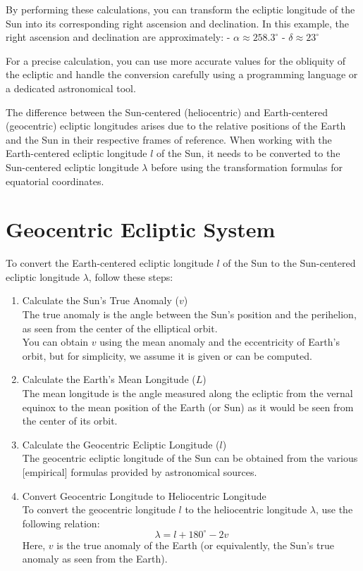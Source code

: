 \documentclass[12pt,a4paper]{article}
\begin{document}
	By performing these calculations, you can transform the ecliptic longitude of the Sun into its corresponding right ascension and declination. In this example, the right ascension and declination are approximately:
	- \(\alpha \approx 258.3^\circ\)
	- \(\delta \approx 23^\circ\)
	
	For a precise calculation, you can use more accurate values for the obliquity of the ecliptic and handle the conversion carefully using a programming language or a dedicated astronomical tool.
	
	The difference between the Sun-centered (heliocentric) and Earth-centered (geocentric) ecliptic longitudes arises due to the relative positions of the Earth and the Sun in their respective frames of reference. When working with the Earth-centered ecliptic longitude \(l\) of the Sun, it needs to be converted to the Sun-centered ecliptic longitude \(\lambda\) before using the transformation formulas for equatorial coordinates.
	
	\section{Geocentric Ecliptic System}
	
	To convert the Earth-centered ecliptic longitude \(l\) of the Sun to the Sun-centered ecliptic longitude \(\lambda\), follow these steps:
	
	\begin{enumerate}
		\item Calculate the Sun's True Anomaly (\(v\)) \\
		The true anomaly is the angle between the Sun's position and the perihelion, as seen from the center of the elliptical orbit. \\
		You can obtain \(v\) using the mean anomaly and the eccentricity of Earth's orbit, but for simplicity, we assume it is given or can be computed.
		
		\item Calculate the Earth's Mean Longitude (\(L\)) \\
		The mean longitude is the angle measured along the ecliptic from the vernal equinox to the mean position of the Earth (or Sun) as it would be seen from the center of its orbit.
		
		\item Calculate the Geocentric Ecliptic Longitude (\(l\)) \\
		The geocentric ecliptic longitude of the Sun can be obtained from the various [empirical] formulas provided by astronomical sources.
		
		\item Convert Geocentric Longitude to Heliocentric Longitude \\
		To convert the geocentric longitude \(l\) to the heliocentric longitude \(\lambda\), use the following relation:
		\[
		\lambda = l + 180^\circ - 2v
		\]
		Here, \(v\) is the true anomaly of the Earth (or equivalently, the Sun's true anomaly as seen from the Earth).
	\end{enumerate}
	
\end{document}
